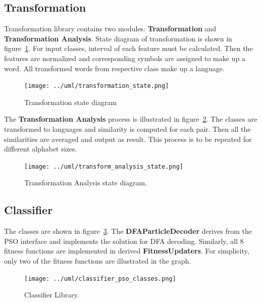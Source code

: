 \documentclass{mini}
\begin{document}
\subsection{Transformation}
Transformation library contains two modules: {\bf Transformation} and {\bf Transformation Analysis}. State diagram of transformation is shown in figure~\ref{fig:transform_state}. For input classes, interval of each feature must be calculated. Then the features are normalized and corresponding symbols are assigned to make up a word. All transformed words from respective class make up a language.


\begin{figure}
    \centering
    \texttt{[image: ../uml/transformation\_state.png]}
    \caption{Transformation state diagram}
    \label{fig:transform_state}
\end{figure}

The {\bf Transformation Analysis} process is illustrated in figure~\ref{fig:transform_analysis_state}. The classes are transformed to languages and similarity is computed for each pair. Then all the similarities are averaged and output as result. This process is to be repeated for different alphabet sizes.

\begin{figure}
    \centering
    \texttt{[image: ../uml/transform\_analysis\_state.png]}
    \caption{Transformation Analysis state diagram.}
    \label{fig:transform_analysis_state}
\end{figure}


\subsection{Classifier}

The classes are shown in figure~\ref{fig:classifier_pso_classes}. The {\bf DFAParticleDecoder} derives from the PSO interface and implements the solution for DFA decoding. Similarly, all 8 fitness functions are implemented in derived {\bf FitnessUpdaters}. For simplicity, only two of the fitness functions are illustrated in the graph.

\begin{figure}
    \centering
    \texttt{[image: ../uml/classifier\_pso\_classes.png]}
    \caption{Classifier Library.}
    \label{fig:classifier_pso_classes}
\end{figure}
\end{document}
